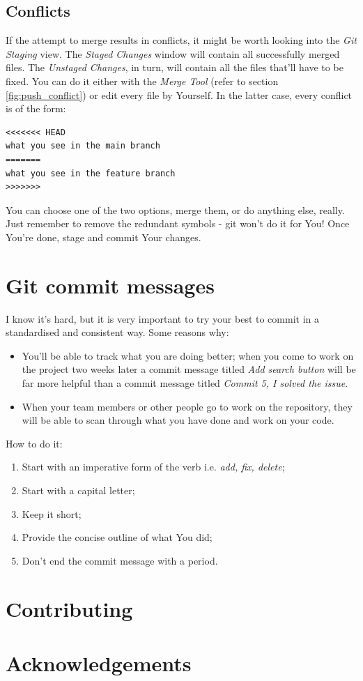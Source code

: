 \documentclass{article}
\begin{document}
\subsection{Conflicts}
\label{sec:conflicts}

If the attempt to merge results in conflicts, it might be worth looking into the \textit{Git Staging} view. The \textit{Staged Changes} window will contain all successfully merged files. The \textit{Unstaged Changes}, in turn, will contain all the files that'll have to be fixed. You can do it either with the \textit{Merge Tool} (refer to section \ref{fig:push_conflict}) or edit every file by Yourself. In the latter case, every conflict is of the form:
\begin{verbatim}
<<<<<<< HEAD
what you see in the main branch
=======
what you see in the feature branch
>>>>>>>
\end{verbatim}
You can choose one of the two options, merge them, or do anything else, really. Just remember to remove the redundant symbols - git won't do it for You! Once You're done, stage and commit Your changes.


\section{Git commit messages}
\label{sec:commit_messages}
I know it's hard, but it is very important to try your best to commit in a standardised and consistent way. Some reasons why: 
\begin{itemize}
    \item You'll be able to track what you are doing better; when you come to work on the project two weeks later a commit message titled \textit{Add search button} will be far more helpful than a commit message titled \textit{Commit 5, I solved the issue}.
    \item When your team members or other people go to work on the repository, they will be able to scan through what you have done and work on your code. 
\end{itemize}

How to do it: 
\begin{enumerate}
    \item Start with an imperative form of the verb i.e. \textit{add, fix, delete};
    \item Start with a capital letter; 
    \item Keep it short;
    \item Provide the concise outline of what You did;
    \item Don't end the commit message with a period. 
\end{enumerate}

\section{Contributing}
\label{sec:contributing}

\section{Acknowledgements}
\end{document}
